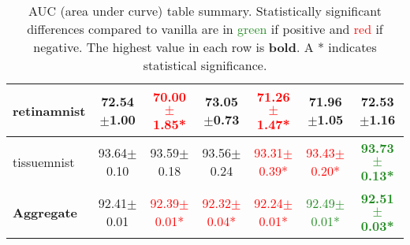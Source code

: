 \documentclass{article}
\begin{document}
\begin{table}[h]
{\begin{tabular}{l|cccccc}
        retinamnist & 72.54$\pm$1.00 & \textcolor{red}{70.00$\pm$1.85*} & \textbf{73.05$\pm$0.73} & \textcolor{red}{71.26$\pm$1.47*} & 71.96$\pm$1.05 & 72.53$\pm$1.16 \\ \hline
        tissuemnist & 93.64$\pm$0.10 & 93.59$\pm$0.18 & 93.56$\pm$0.24 & \textcolor{red}{93.31$\pm$0.39*} & \textcolor{red}{93.43$\pm$0.20*} & \textbf{\textcolor{ForestGreen}{93.73$\pm$0.13*}} \\ \hline
        \textbf{Aggregate} & 92.41$\pm$0.01 & \textcolor{red}{92.39$\pm$0.01*} & \textcolor{red}{92.32$\pm$0.04*} & \textcolor{red}{92.24$\pm$0.01*} & \textcolor{ForestGreen}{92.49$\pm$0.01*} & \textbf{\textcolor{ForestGreen}{92.51$\pm$0.03*}} \\ \hline
    \end{tabular}
    }
    \caption{AUC (area under curve) table summary. Statistically significant differences compared to vanilla are in \textcolor{ForestGreen}{green} if positive and \textcolor{red}{red} if negative. The highest value in each row is \textbf{bold}. A * indicates statistical significance.}
    \label{tab:results2}
\end{table}
\end{document}
